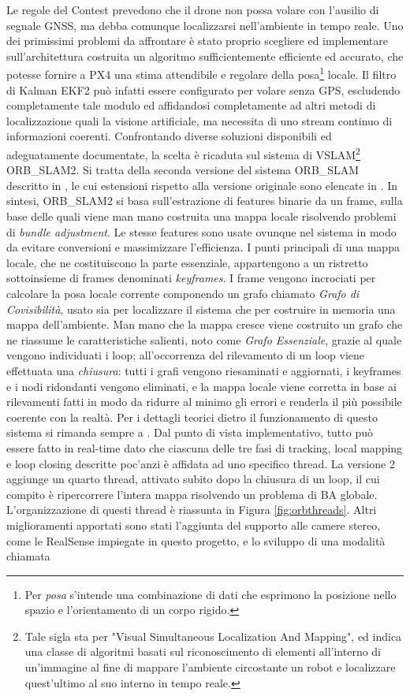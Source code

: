 \indent Le regole del Contest prevedono che il drone non possa volare con l'ausilio di segnale GNSS, ma debba comunque localizzarsi nell'ambiente in tempo reale. Uno dei primissimi problemi da affrontare è stato proprio scegliere ed implementare sull'architettura costruita un algoritmo sufficientemente efficiente ed accurato, che potesse fornire a PX4 una stima attendibile e regolare della posa\footnote{Per \emph{posa} s'intende una combinazione di dati che esprimono la posizione nello spazio e l'orientamento di un corpo rigido.} locale. Il filtro di Kalman EKF2 può infatti essere configurato per volare senza GPS, escludendo completamente tale modulo ed affidandosi completamente ad altri metodi di localizzazione quali la visione artificiale, ma necessita di uno stream continuo di informazioni coerenti. Confrontando diverse soluzioni disponibili ed adeguatamente documentate, la scelta è ricaduta sul sistema di VSLAM\footnote{Tale sigla sta per "Visual Simultaneous Localization And Mapping", ed indica una classe di algoritmi basati sul riconoscimento di elementi all'interno di un'immagine al fine di mappare l'ambiente circostante un robot e localizzare quest'ultimo al suo interno in tempo reale.} ORB\_SLAM2. Si tratta della seconda versione del sistema ORB\_SLAM descritto in \cite{orbslam}, le cui estensioni rispetto alla versione originale sono elencate in \cite{orbslam2}. In sintesi, ORB\_SLAM2 si basa sull'estrazione di features binarie da un frame, sulla base delle quali viene man mano costruita una mappa locale risolvendo problemi di \emph{bundle adjustment}. Le stesse features sono usate ovunque nel sistema in modo da evitare conversioni e massimizzare l'efficienza. I punti principali di una mappa locale, che ne costituiscono la parte essenziale, appartengono a un ristretto sottoinsieme di frames denominati \emph{keyframes}. I frame vengono incrociati per calcolare la posa locale corrente componendo un grafo chiamato \emph{Grafo di Covisibilità}, usato sia per localizzare il sistema che per costruire in memoria una mappa dell'ambiente. Man mano che la mappa cresce viene costruito un grafo che ne riassume le caratteristiche salienti, noto come \emph{Grafo Essenziale}, grazie al quale vengono individuati i loop; all'occorrenza del rilevamento di un loop viene effettuata una \emph{chiusura}: tutti i grafi vengono riesaminati e aggiornati, i keyframes e i nodi ridondanti vengono eliminati, e la mappa locale viene corretta in base ai rilevamenti fatti in modo da ridurre al minimo gli errori e renderla il più possibile coerente con la realtà. Per i dettagli teorici dietro il funzionamento di questo sistema si rimanda sempre a \cite{orbslam}. Dal punto di vista implementativo, tutto può essere fatto in real-time dato che ciascuna delle tre fasi di tracking, local mapping e loop closing descritte poc'anzi è affidata ad uno specifico thread. La versione 2 aggiunge un quarto thread, attivato subito dopo la chiusura di un loop, il cui compito è ripercorrere l'intera mappa risolvendo un problema di BA globale. L'organizzazione di questi thread è riassunta in Figura \ref{fig:orbthreads}. Altri miglioramenti apportati sono stati l'aggiunta del supporto alle camere stereo, come le RealSense impiegate in questo progetto, e lo sviluppo di una modalità chiamata 